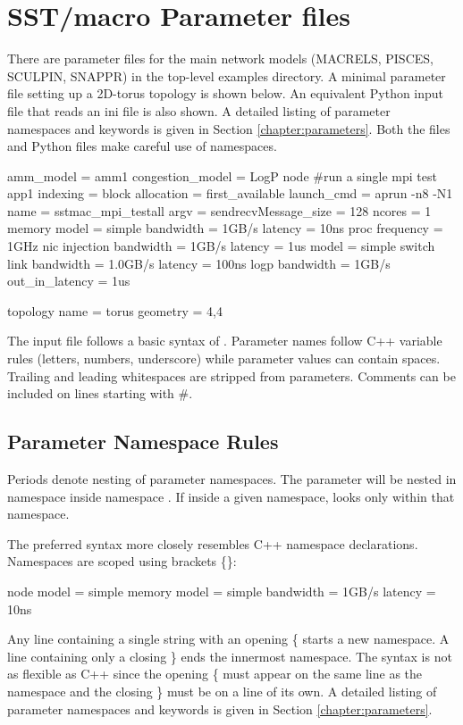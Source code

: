 
\section{SST/macro Parameter files}
\label{sec:parameters}

There are parameter files for the main network models (MACRELS, PISCES, SCULPIN, SNAPPR) in the top-level examples directory.
A minimal parameter file setting up a 2D-torus topology is shown below. 
An equivalent Python input file that reads an ini file is also shown.
A detailed listing of parameter namespaces and keywords is given in Section \ref{chapter:parameters}.
Both the  files and Python files make careful use of namespaces.

\begin{ViFile}
amm_model = amm1
congestion_model = LogP
node {
 #run a single mpi test
 app1 {
  indexing = block
  allocation = first_available
  launch_cmd = aprun -n8 -N1
  name = sstmac_mpi_testall
  argv =
  sendrecvMessage_size = 128
 }
 ncores = 1
 memory {
  model = simple
  bandwidth = 1GB/s
  latency = 10ns
 }
 proc {
  frequency = 1GHz
 }
 nic {
  injection {
   bandwidth = 1GB/s
   latency = 1us
  }
  model = simple
 }
}
switch {
 link {
  bandwidth = 1.0GB/s
   latency = 100ns
 }
 logp {
   bandwidth = 1GB/s
   out_in_latency = 1us
 }
}

topology {
 name = torus
 geometry = 4,4
}
\end{ViFile}
The input file follows a basic syntax of .
Parameter names follow C++ variable rules (letters, numbers, underscore) while parameter values can contain spaces.  Trailing and leading whitespaces are stripped from parameters.
Comments can be included on lines starting with \#.

\subsection{Parameter Namespace Rules}
\label{subsec:parameterNamespace}
Periods denote nesting of parameter namespaces.
The parameter  will be nested in namespace  inside namespace .
If inside a given namespace, \sstmacro looks only within that namespace.

The preferred syntax more closely resembles C++ namespace declarations. 
Namespaces are scoped using brackets \{\}:

\begin{ViFile}
node {
 model = simple
 memory {
   model = simple
   bandwidth = 1GB/s
   latency = 10ns
 }
}
\end{ViFile}
Any line containing a single string with an opening \{ starts a new namespace.
A line containing only a closing \} ends the innermost namespace.
The syntax is not as flexible as C++ since the opening \{ must appear on the same line as the namespace and the closing \} must be on a line of its own.
A detailed listing of parameter namespaces and keywords is given in Section \ref{chapter:parameters}.

